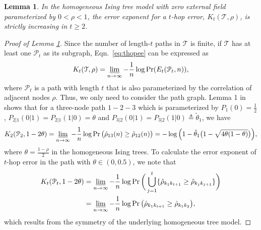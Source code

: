 \documentclass[11pt,onecolumn]{article}
\newcommand{\calP}{\mathcal{P}}
\newcommand{\calT}{\mathcal{T}}
\newcommand{\ttheta}{\tilde{\theta}}
\newcommand{\hrho}{\hat{\rho}}
\newtheorem{lemma}{Lemma}
\begin{document}
\begin{lemma}\label{lem:mono}
	In the homogeneous Ising tree model with zero external field parameterized by $0<\rho<1$, the error exponent for a $t$-hop error, $K _{t}(\calT,\rho)$, is strictly increasing in $t\geq 2$.
\end{lemma}
\begin{proof}[Proof of Lemma \ref{lem:mono}]
	Since the number of length-$t$ paths in $\calT$ is finite, if $\calT$ has at least one $\calP_{t}$ as its subgraph, Eqn.~\eqref{eq:thopee} can be expressed as
	\begin{align}
		K _{t}(\calT,\rho)=\varliminf_{n\rightarrow \infty}-\frac{1}{n}\log\Pr (E_{t}(\calP_{t},n)),
	\end{align}
	where $\calP_{t}$ is a path with length $t$ that is also parameterized by the correlation of adjacent nodes $\rho$. Thus, we only need to consider the path graph. Lemma 1 in \cite{tandon2020exact} shows that for a three-node path $1-2-3$ which is parameterized by $P_{1}(0)=\frac{1}{2}$, $P_{2|1}(0|1)=P_{2|1}(1|0)=\theta$ 
	and $P_{3|2}(0|1)=P_{3|2}(1|0)\triangleq\ttheta_{1}$, we have
	\begin{align}
		K_{2}(\calP_{2},1-2\theta)=\varliminf_{n\rightarrow \infty}-\frac{1}{n}\log\Pr\big(\hrho_{13}(n)\geq\hrho_{12}(n)\big) 
		=-\log\Big(1-\ttheta_{1}\big(1-\sqrt{4\theta(1-\theta)}\big)\Big),
	\end{align}
	where $\theta=\frac{1-\rho}{2}$ in the homogeneous Ising trees. To calculate the error exponent of $t$-hop error in the path with $\theta\in (0,0.5)$, we note that
	\begin{align}
		K _{t}(\calP_{t},1-2\theta)&=\varliminf_{n\rightarrow \infty}-\frac{1}{n}\log\Pr\bigg(\bigcup_{j=1}^{t}\{\hrho_{k_{1}k_{t+1}}\geq \hrho_{k_{j}k_{j+1}}\}\bigg)\\*
		&=\varliminf_{n\rightarrow \infty}-\frac{1}{n}\log\Pr\big(\hrho_{k_{1}k_{t+1}}\geq \hrho_{k_{1}k_{2}}\big),
	\end{align}
	which results from the symmetry of the underlying homogeneous tree model.


\end{proof}
\end{document}
